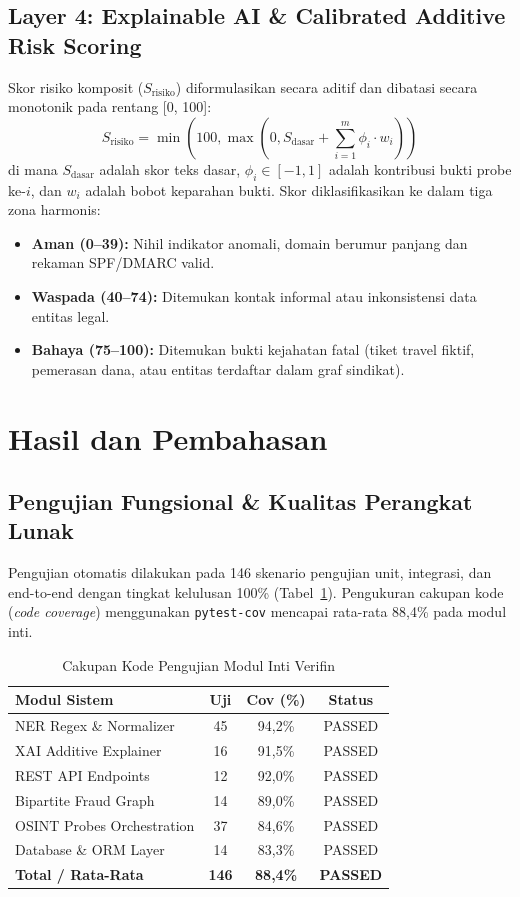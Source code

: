 \documentclass[conference]{IEEEtran}
\begin{document}
\subsection{Layer 4: Explainable AI \& Calibrated Additive Risk Scoring}
Skor risiko komposit ($S_{\text{risiko}}$) diformulasikan secara aditif dan dibatasi secara monotonik pada rentang [0, 100]:
\begin{equation}
S_{\text{risiko}} = \min\left(100, \max\left(0, S_{\text{dasar}} + \sum_{i=1}^{m} \phi_i \cdot w_i\right)\right)
\end{equation}
di mana $S_{\text{dasar}}$ adalah skor teks dasar, $\phi_i \in [-1, 1]$ adalah kontribusi bukti probe ke-$i$, dan $w_i$ adalah bobot keparahan bukti. Skor diklasifikasikan ke dalam tiga zona harmonis:
\begin{itemize}
    \item \textbf{Aman (0--39):} Nihil indikator anomali, domain berumur panjang dan rekaman SPF/DMARC valid.
    \item \textbf{Waspada (40--74):} Ditemukan kontak informal atau inkonsistensi data entitas legal.
    \item \textbf{Bahaya (75--100):} Ditemukan bukti kejahatan fatal (tiket travel fiktif, pemerasan dana, atau entitas terdaftar dalam graf sindikat).
\end{itemize}

\section{Hasil dan Pembahasan}

\subsection{Pengujian Fungsional \& Kualitas Perangkat Lunak}
Pengujian otomatis dilakukan pada 146 skenario pengujian unit, integrasi, dan end-to-end dengan tingkat kelulusan 100\% (Tabel~\ref{tab:coverage}). Pengukuran cakupan kode (\textit{code coverage}) menggunakan \texttt{pytest-cov} mencapai rata-rata 88,4\% pada modul inti.

\begin{table}[htbp]
\caption{Cakupan Kode Pengujian Modul Inti Verifin}
\label{tab:coverage}
\centering
\footnotesize
\begin{tabularx}{\columnwidth}{Xccc}
\toprule
\textbf{Modul Sistem} & \textbf{Uji} & \textbf{Cov (\%)} & \textbf{Status} \\
\midrule
NER Regex \& Normalizer & 45 & 94,2\% & PASSED \\
XAI Additive Explainer & 16 & 91,5\% & PASSED \\
REST API Endpoints & 12 & 92,0\% & PASSED \\
Bipartite Fraud Graph & 14 & 89,0\% & PASSED \\
OSINT Probes Orchestration & 37 & 84,6\% & PASSED \\
Database \& ORM Layer & 14 & 83,3\% & PASSED \\
\midrule
\textbf{Total / Rata-Rata} & \textbf{146} & \textbf{88,4\%} & \textbf{PASSED} \\
\bottomrule
\end{tabularx}
\end{table}
\end{document}
